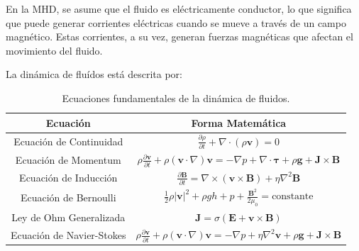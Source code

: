\documentclass[article,12pt]{elsarticle}
\begin{document}
    En la MHD, se asume que el fluido es eléctricamente conductor, lo que significa que puede generar corrientes eléctricas cuando se mueve a través de un campo magnético. Estas corrientes, a su vez, generan fuerzas magnéticas que afectan el movimiento del fluido.
    
    La dinámica de fluídos está descrita por:

    \begin{table}[h!]
\centering
\begin{tabular}{|c|c|}
\hline
\textbf{Ecuación}          & \textbf{Forma Matemática}                                                                                                                                                     \\ \hline
Ecuación de Continuidad    & $\frac{\partial \rho}{\partial t} + \nabla \cdot (\rho \mathbf{v}) = 0$                                                                                                       \\ \hline
Ecuación de Momentum       & $\rho \frac{\partial \mathbf{v}}{\partial t} + \rho (\mathbf{v} \cdot \nabla) \mathbf{v} = -\nabla p + \nabla \cdot \mathbf{\tau} + \rho \mathbf{g} + \mathbf{J} \times \mathbf{B}$ \\ \hline
Ecuación de Inducción      & $\frac{\partial \mathbf{B}}{\partial t} = \nabla \times (\mathbf{v} \times \mathbf{B}) + \eta \nabla^2 \mathbf{B}$                                                                 \\ \hline
Ecuación de Bernoulli      & $\frac{1}{2} \rho |\mathbf{v}|^2 + \rho g h + p + \frac{\mathbf{B}^2}{2\mu_0} = \text{constante}$                                                                             \\ \hline
Ley de Ohm Generalizada    & $\mathbf{J} = \sigma (\mathbf{E} + \mathbf{v} \times \mathbf{B})$                                                                                                            \\ \hline
Ecuación de Navier-Stokes  & $\rho \frac{\partial \mathbf{v}}{\partial t} + \rho (\mathbf{v} \cdot \nabla) \mathbf{v} = -\nabla p + \eta \nabla^2 \mathbf{v} + \rho \mathbf{g} + \mathbf{J} \times \mathbf{B}$ \\ \hline
\end{tabular}
\caption{Ecuaciones fundamentales de la dinámica de fluidos.}
\label{tab:MHD_Ecuaciones}
\end{table}
    
\end{document}
